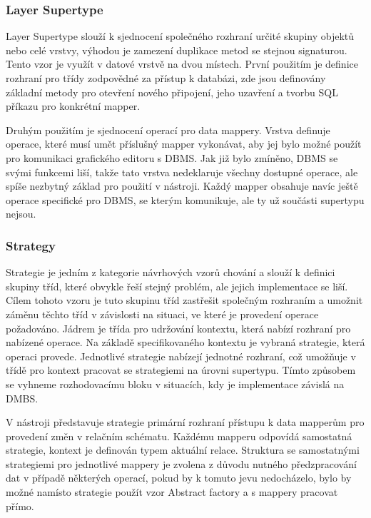 \documentclass[czech,bachelor,public,dept460,male,oneside]{diploma}
\begin{document}
		\subsubsection{Layer Supertype}
		Layer Supertype slouží k sjednocení společného rozhraní určité skupiny objektů nebo celé vrstvy, výhodou je zamezení duplikace metod se stejnou signaturou. Tento vzor je využít v datové vrstvě na dvou místech. První použitím je definice rozhraní pro třídy zodpovědné za přístup k databázi, zde jsou definovány základní metody pro otevření nového připojení, jeho uzavření a tvorbu SQL příkazu pro konkrétní mapper. 
		
		Druhým použitím je sjednocení operací pro data mappery. Vrstva definuje operace, které musí umět příslušný mapper vykonávat, aby jej bylo možné použít pro komunikaci grafického editoru s DBMS. Jak již bylo zmíněno, DBMS se svými funkcemi liší, takže tato vrstva nedeklaruje všechny dostupné operace, ale spíše nezbytný základ pro použití v nástroji. Každý mapper obsahuje navíc ještě operace specifické pro DBMS, se kterým komunikuje, ale ty už součásti supertypu nejsou.
	
		\subsubsection{Strategy} \label{secStrategy}
		Strategie je jedním z kategorie návrhových vzorů chování a slouží k definici skupiny tříd, které obvykle řeší stejný problém, ale jejich implementace se liší. Cílem tohoto vzoru je tuto skupinu tříd zastřešit společným rozhraním a umožnit záměnu těchto tříd v závislosti na situaci, ve které je provedení operace požadováno. Jádrem je třída pro udržování kontextu, která nabízí rozhraní pro nabízené operace. Na základě specifikovaného kontextu je vybraná strategie, která operaci provede. Jednotlivé strategie nabízejí jednotné rozhraní, což umožňuje v třídě pro kontext pracovat se strategiemi na úrovni supertypu. Tímto způsobem se vyhneme rozhodovacímu bloku v situacích, kdy je implementace závislá na DMBS.
		
		V nástroji představuje strategie primární rozhraní přístupu k data mapperům pro provedení změn v relačním schématu. Každému mapperu odpovídá samostatná strategie, kontext je definován typem aktuální relace. Struktura se samostatnými strategiemi pro jednotlivé mappery je zvolena z důvodu nutného předzpracování dat v případě některých operací, pokud by k tomuto jevu nedocházelo, bylo by možné namísto strategie použít vzor Abstract factory a s mappery pracovat přímo. 
		
\end{document}
